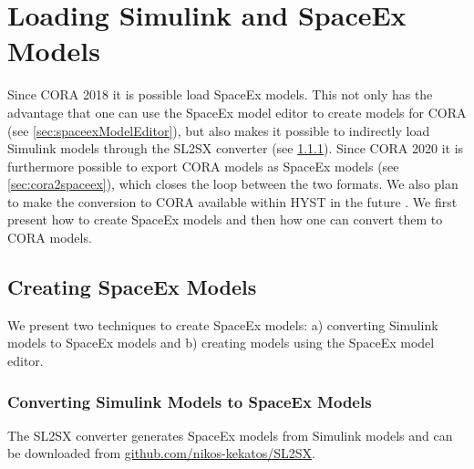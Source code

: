 
\section{Loading Simulink and SpaceEx Models} \label{sec:loadingModels}

Since CORA 2018 it is possible load SpaceEx models. This not only has the advantage that one can use the SpaceEx model editor to create models for CORA (see \cref{sec:spaceexModelEditor}), but also makes it possible to indirectly load Simulink models through the SL2SX converter \cite{Minopoli2016,Kekatos2017} (see \cref{sec:sl2sxConverter}). Since CORA 2020 it is furthermore possible to export CORA models as SpaceEx models (see  \cref{sec:cora2spaceex}), which closes the loop between the two formats. We also plan to make the conversion to CORA available within HYST in the future \cite{Bak2015}. We first present how to create SpaceEx models and then how one can convert them to CORA models.

 
\subsection{Creating SpaceEx Models} \label{sec:creatingSpaceExModels}

We present two techniques to create SpaceEx models: a) converting Simulink models to SpaceEx models and b) creating models using the SpaceEx model editor.

\subsubsection{Converting Simulink Models to SpaceEx Models} \label{sec:sl2sxConverter}

The SL2SX converter generates SpaceEx models from Simulink models and can be downloaded from \href{https://github.com/nikos-kekatos/SL2SX}{github.com/nikos-kekatos/SL2SX}.

